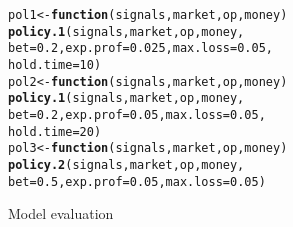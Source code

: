 \documentclass{article}\usepackage[]{graphicx}\usepackage[]{color}
\makeatletter
\newcommand{\hlnum}[1]{\textcolor[rgb]{0.686,0.059,0.569}{#1}}%
\newcommand{\hlstd}[1]{\textcolor[rgb]{0.345,0.345,0.345}{#1}}%
\newcommand{\hlkwa}[1]{\textcolor[rgb]{0.161,0.373,0.58}{\textbf{#1}}}%
\newcommand{\hlkwb}[1]{\textcolor[rgb]{0.69,0.353,0.396}{#1}}%
\newcommand{\hlkwc}[1]{\textcolor[rgb]{0.333,0.667,0.333}{#1}}%
\newcommand{\hlkwd}[1]{\textcolor[rgb]{0.737,0.353,0.396}{\textbf{#1}}}%
\newenvironment{kframe}{%
 \def\at@end@of@kframe{}%
 \ifinner\ifhmode%
  \def\at@end@of@kframe{\end{minipage}}%
  \begin{minipage}{\columnwidth}%
 \fi\fi%
 \def\FrameCommand##1{\hskip\@totalleftmargin \hskip-\fboxsep
 \colorbox{shadecolor}{##1}\hskip-\fboxsep
     \hskip-\linewidth \hskip-\@totalleftmargin \hskip\columnwidth}%
 \MakeFramed {\advance\hsize-\width
   \@totalleftmargin\z@ \linewidth\hsize
   \@setminipage}}%
 {\par\unskip\endMakeFramed%
 \at@end@of@kframe}
\newenvironment{knitrout}{}{} %
\makeatother
\begin{document}
\begin{knitrout}
\color{fgcolor}\begin{kframe}
\begin{alltt}
\hlstd{pol1} \hlkwb{<-} \hlkwa{function}\hlstd{(}\hlkwc{signals}\hlstd{,} \hlkwc{market}\hlstd{,} \hlkwc{op}\hlstd{,} \hlkwc{money}\hlstd{)}
  \hlkwd{policy.1}\hlstd{(signals, market, op, money,}
           \hlkwc{bet} \hlstd{=} \hlnum{0.2}\hlstd{,} \hlkwc{exp.prof} \hlstd{=} \hlnum{0.025}\hlstd{,} \hlkwc{max.loss} \hlstd{=} \hlnum{0.05}\hlstd{,}
           \hlkwc{hold.time} \hlstd{=} \hlnum{10}\hlstd{)}
\hlstd{pol2} \hlkwb{<-} \hlkwa{function}\hlstd{(}\hlkwc{signals}\hlstd{,} \hlkwc{market}\hlstd{,} \hlkwc{op}\hlstd{,} \hlkwc{money}\hlstd{)}
  \hlkwd{policy.1}\hlstd{(signals, market, op, money,}
           \hlkwc{bet} \hlstd{=} \hlnum{0.2}\hlstd{,} \hlkwc{exp.prof} \hlstd{=} \hlnum{0.05}\hlstd{,} \hlkwc{max.loss} \hlstd{=} \hlnum{0.05}\hlstd{,}
           \hlkwc{hold.time} \hlstd{=} \hlnum{20}\hlstd{)}
\hlstd{pol3} \hlkwb{<-} \hlkwa{function}\hlstd{(}\hlkwc{signals}\hlstd{,} \hlkwc{market}\hlstd{,} \hlkwc{op}\hlstd{,} \hlkwc{money}\hlstd{)}
  \hlkwd{policy.2}\hlstd{(signals, market, op, money,}
           \hlkwc{bet} \hlstd{=} \hlnum{0.5}\hlstd{,} \hlkwc{exp.prof} \hlstd{=} \hlnum{0.05}\hlstd{,} \hlkwc{max.loss} \hlstd{=} \hlnum{0.05}\hlstd{)}
\end{alltt}
\end{kframe}
\end{knitrout}
Model evaluation
\end{document}
